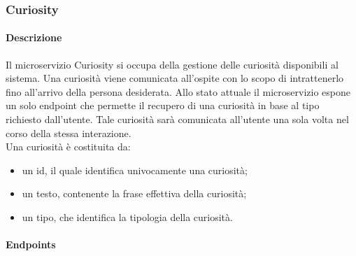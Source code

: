 \subsubsection{Curiosity}
\paragraph{Descrizione}
Il microservizio Curiosity si occupa della gestione delle curiosità disponibili al sistema. Una curiosità viene comunicata all'ospite con lo scopo di intrattenerlo fino all'arrivo della persona desiderata. Allo stato attuale il microservizio espone un solo endpoint che permette il recupero di una curiosità in base al tipo richiesto dall'utente. Tale curiosità sarà comunicata all'utente una sola volta nel corso della stessa interazione.\\
Una curiosità è costituita da: \begin{itemize}
\item un id, il quale identifica univocamente una curiosità;
\item un testo, contenente la frase effettiva della curiosità;
\item un tipo, che identifica la tipologia della curiosità.
\end{itemize}
\paragraph{Endpoints}

